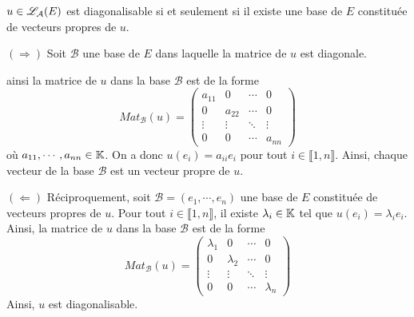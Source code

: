 \documentclass[a4paper, 12pt]{article}
\begin{document}
\begin{theoreme}{}{}
    $u \in \mathscr{L}_\mathcal{A}(E)$ est diagonalisable si et seulement si il existe une base de $E$ constituée de vecteurs propres de $u$. 
\end{theoreme}

\begin{demonstration}
    $(\Rightarrow)$ Soit $\mathcal{B}$ une base de $E$ dans laquelle la matrice de $u$ est diagonale.
    
    ainsi la matrice de $u$ dans la base $\mathcal{B}$ est de la forme
    $$
    Mat_{\mathcal{B}}(u) = \begin{pmatrix}
        a_{11} & 0 & \cdots & 0 \\
        0 & a_{22} & \cdots & 0 \\
        \vdots & \vdots & \ddots & \vdots \\
        0 & 0 & \cdots & a_{nn}
    \end{pmatrix}
    $$
    où $a_{11}, \cdots, a_{nn} \in \mathbb{K}$.
    On a donc $u(e_i) = a_{ii} e_i$ pour tout $i \in \llbracket 1, n \rrbracket$.
    Ainsi, chaque vecteur de la base $\mathcal{B}$ est un vecteur propre de $u$.

    $(\Leftarrow)$ Réciproquement, soit $\mathcal{B} = (e_1, \cdots, e_n)$ une base de $E$ constituée de vecteurs propres de $u$.
    Pour tout $i \in \llbracket 1, n \rrbracket$, il existe $\lambda_i \in \mathbb{K}$ tel que $u(e_i) = \lambda_i e_i$.
    Ainsi, la matrice de $u$ dans la base $\mathcal{B}$ est de la forme
    $$
    Mat_{\mathcal{B}}(u) = \begin{pmatrix}
        \lambda_1 & 0 & \cdots & 0 \\
        0 & \lambda_2 & \cdots & 0 \\
        \vdots & \vdots & \ddots & \vdots \\
        0 & 0 & \cdots & \lambda_n
    \end{pmatrix}
    $$
    Ainsi, $u$ est diagonalisable.
\end{demonstration}
\end{document}
